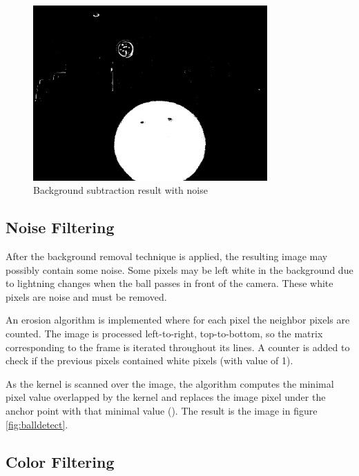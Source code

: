\begin{figure}[htp]
	
	\centering
	\includegraphics[width=0.8\textwidth]{capcalib/imgs/noise.png}
	
	\caption{Background subtraction result with noise}
	\label{fig:ballnoise}
	
\end{figure}

\subsection{Noise Filtering}

After the background removal technique is applied, the resulting image may possibly contain some noise. Some pixels may be left white in the background due to lightning changes when the ball passes in front of the camera. These white pixels are noise and must be removed.

An erosion algorithm is implemented where for each pixel the neighbor pixels are counted. The image is processed left-to-right, top-to-bottom, so the matrix corresponding to the frame is iterated throughout its lines. A counter is added to check if the previous pixels contained white pixels (with value of 1). 

As the kernel is scanned over the image, the algorithm computes the minimal pixel value overlapped by the kernel and replaces the image pixel under the anchor point with that minimal value (\cite{OpenCV2.4.13.6documentation}). The result is the image in figure \ref{fig:balldetect}.

\subsection{Color Filtering}

